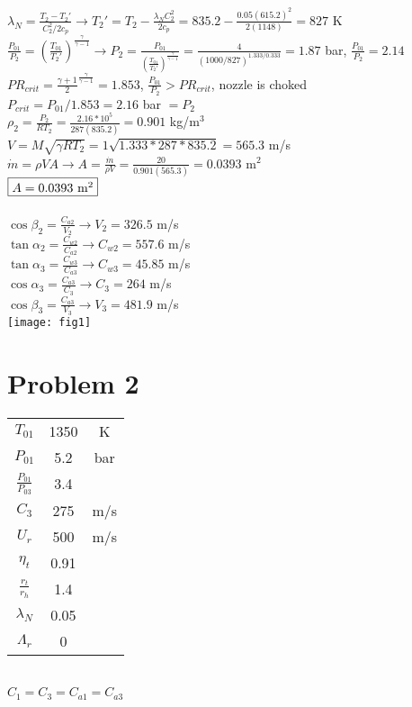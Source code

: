 \documentclass{article}
\begin{document}
$\lambda_N=\frac{T_2-T_2'}{C_2^2/2c_p} \rightarrow T_2'=T_2-\frac{\lambda_NC_2^2}{2c_p}=
835.2-\frac{0.05(615.2)^2}{2(1148)}=827$ K \\
$\frac{P_{01}}{P_{2}}=(\frac{T_{01}}{T_2'})^\frac{\gamma}{\gamma-1}
\rightarrow P_2=\frac{P_{01}}{(\frac{T_{01}}{T_2'})^\frac{\gamma}{\gamma-1}}=
\frac{4}{(1000/827)^{1.333/0.333}}=1.87$ bar, \quad $\frac{P_{01}}{P_2}=2.14$ \\
$PR_{crit}=\frac{\gamma+1}{2}^\frac{\gamma}{\gamma-1}=1.853$, \quad $\frac{P_{01}}{P_2}>PR_{crit}$,
\quad nozzle is choked \\
$P_{crit}=P_{01}/1.853=2.16$ bar $=P_2$ \\
$\rho_2=\frac{P_2}{RT_2}=\frac{2.16*10^5}{287(835.2)}=0.901$ kg/m$^3$ \\
$V=M\sqrt{\gamma RT_2}=1\sqrt{1.333*287*835.2}=565.3$ m/s \\
$\dot{m}=\rho VA \rightarrow A=\frac{\dot{m}}{\rho V}=\frac{20}{0.901(565.3)}=0.0393$ m$^2$ \\
$\fbox{$A=0.0393$ m$^2$}$ \\\\
$\cos\beta_2=\frac{C_{a2}}{V_2} \rightarrow V_2=326.5$ m/s \\
$\tan\alpha_2=\frac{C_{w2}}{C_{a2}} \rightarrow C_{w2}=557.6$ m/s \\
$\tan\alpha_3=\frac{C_{w3}}{C_{a3}} \rightarrow C_{w3}=45.85$ m/s \\
$\cos\alpha_3=\frac{C_{a3}}{C_3} \rightarrow C_3=264$ m/s \\
$\cos\beta_3=\frac{C_{a3}}{V_3} \rightarrow V_3=481.9$ m/s \\
\texttt{[image: fig1]}

\section*{Problem 2}
\begin{tabular}{ccc}
    $T_{01}$ & 1350 & K \\
    $P_{01}$ & 5.2 & bar \\
    $\frac{P_{01}}{P_{03}}$ & 3.4 \\
    $C_3$ & 275 & m/s \\
    $U_r$ & 500 & m/s \\
    $\eta_t$ & 0.91 \\
    $\frac{r_t}{r_h}$ & 1.4 \\
    $\lambda_N$ & 0.05 \\
    $\Lambda_r$ & 0 \\
\end{tabular} \\ $C_1=C_3=C_{a1}=C_{a3}$
\end{document}

